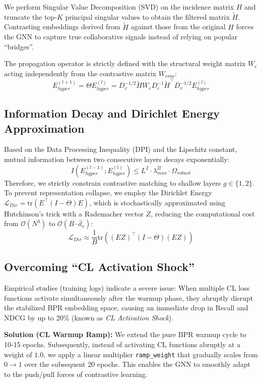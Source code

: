 We perform Singular Value Decomposition (SVD) on the incidence matrix $H$ and truncate the top-$K$ principal singular values to obtain the filtered matrix $\tilde{H}$. Contrasting embeddings derived from $\tilde{H}$ against those from the original $H$ forces the GNN to capture true collaborative signals instead of relying on popular ``bridges''.

The propagation operator is strictly defined with the structural weight matrix $W_e$ acting independently from the contrastive matrix $W_{ema}$:
\begin{equation}
E_{hyper}^{(l+1)} = \Theta E_{hyper}^{(l)} = D_v^{-1/2} \tilde{H} W_e D_e^{-1} \tilde{H}^{\top} D_v^{-1/2} E_{hyper}^{(l)}
\end{equation}

\subsection{Information Decay and Dirichlet Energy Approximation}
Based on the Data Processing Inequality (DPI) and the Lipschitz constant, mutual information between two consecutive layers decays exponentially:
\begin{equation}
I(E_{hyper}^{(l-1)}; E_{hyper}^{(l)}) \le L^{2} \cdot \lambda_{max}^{2l} \cdot \Omega_{robust}
\end{equation}
Therefore, we strictly constrain contrastive matching to shallow layers $g \in \{1, 2\}$. To prevent representation collapse, we employ the Dirichlet Energy $\mathcal{L}_{Dir} = \text{tr}(E^{\top}(I-\Theta)E)$, which is stochastically approximated using Hutchinson's trick with a Rademacher vector $Z$, reducing the computational cost from $\mathcal{O}(N^3)$ to $\mathcal{O}(B \cdot \bar{d}_{v})$:
\begin{equation}
\mathcal{L}_{Dir} \approx \frac{1}{B} \text{tr}\left((E Z)^\top (I-\Theta) (E Z)\right)
\end{equation}

\subsection{Overcoming ``CL Activation Shock''}
Empirical studies (training logs) indicate a severe issue: When multiple CL loss functions activate simultaneously after the warmup phase, they abruptly disrupt the stabilized BPR embedding space, causing an immediate drop in Recall and NDCG by up to 20\% (known as \textit{CL Activation Shock}).

\textbf{Solution (CL Warmup Ramp):} 
We extend the pure BPR warmup cycle to 10-15 epochs. Subsequently, instead of activating CL functions abruptly at a weight of $1.0$, we apply a linear multiplier \texttt{ramp\_weight} that gradually scales from $0 \rightarrow 1$ over the subsequent 20 epochs. This enables the GNN to smoothly adapt to the push/pull forces of contrastive learning.

